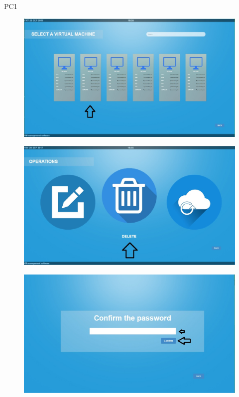 \begin{lyxlist}{PC1}
\begin{figure}[H]
\centering
\includegraphics[width=170mm]{images/createVMMod2.eps}
\caption{\label{overflow}}
\end{figure}

\begin{figure}[H]
\centering
\includegraphics[width=170mm]{images/deleteVM3.eps}
\caption{\label{overflow}}
\end{figure}

\begin{figure}[H]
\centering
\includegraphics[width=170mm]{images/deleteVM4.eps}
\caption{\label{overflow}}
\end{figure}


\end{lyxlist}
